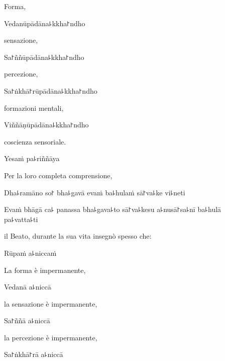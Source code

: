 \begin{english}
Forma,
\end{english}

Vedanūpādāna꜕kkha꜓ndho

\begin{english}
sensazione,
\end{english}

Sa꜓ññūpādāna꜕kkha꜓ndho

\begin{english}
  percezione,
\end{english}

Sa꜓ṅkhā꜓rūpādāna꜕kkha꜓ndho

\begin{english}
  formazioni mentali,
\end{english}

Viññāṇūpādāna꜕kkha꜓ndho

\begin{english}
  coscienza sensoriale.
\end{english}

Yesaṁ pa꜕riññāya

\begin{english}
Per la loro completa comprensione,
\end{english}

Dha꜕ramāno so꜓ bha꜕gavā evaṁ ba꜕hulaṁ sā꜓va꜕ke vi꜕neti

Evaṁ bhāgā ca꜕ panassa bha꜕gava꜕to sā꜓va꜕kesu a꜕nusā꜓sa꜕nī ba꜕hulā pa꜕vatta꜕ti

\begin{english}
il Beato, durante la sua vita insegnò spesso che:
\end{english}


Rūpaṁ a꜕niccaṁ

\begin{english}
La forma è impermanente,
\end{english}

Vedanā a꜕niccā

\begin{english}
la sensazione è impermanente,
\end{english}

Sa꜓ññā a꜕niccā

\begin{english}
la percezione è impermanente,
\end{english}

Sa꜓ṅkhā꜓rā a꜕niccā

